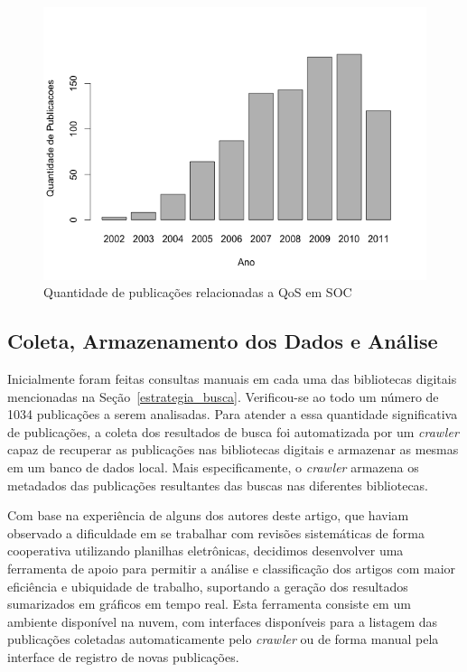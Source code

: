 \begin{figure}[htb]
\centering
\includegraphics[scale=0.5]{imagens/barplotAnoQuantidadePublicacoes.pdf}
\caption{Quantidade de publica\c c\~{o}es relacionadas a QoS em SOC}
\label{fig:barplotAnoPublicacoes}
\end{figure}

\subsection{Coleta, Armazenamento dos Dados e Análise}

Inicialmente foram feitas consultas manuais em cada uma das bibliotecas digitais mencionadas na Se\c c\~{a}o~\ref{estrategia_busca}. Verificou-se ao todo um número de 1034 publicações a serem analisadas. Para atender a essa quantidade significativa de publica\c c\~{o}es, a coleta dos resultados de busca foi automatizada por um \emph{crawler} capaz de recuperar as publica\c c\~{o}es nas bibliotecas digitais e armazenar as mesmas em um banco de dados local. Mais especificamente, o \emph{crawler} armazena os metadados das publicações resultantes das buscas nas diferentes bibliotecas.


Com base na experi\^{e}ncia de alguns dos autores deste artigo, que haviam observado a dificuldade em se trabalhar com revis\~{o}es sistem\'{a}ticas de forma cooperativa utilizando planilhas eletr\^{o}nicas, decidimos desenvolver uma ferramenta de apoio para permitir a an\'{a}lise e 
classifica\c c\~{a}o dos artigos com maior eficiência e ubiquidade de trabalho, suportando a gera\c c\~{a}o dos resultados sumarizados em gr\'{a}ficos em tempo real. Esta ferramenta consiste em um ambiente disponível na nuvem, com interfaces disponíveis para a listagem das publicações coletadas automaticamente pelo \emph{crawler} ou de forma manual pela interface de registro de novas publicações.

